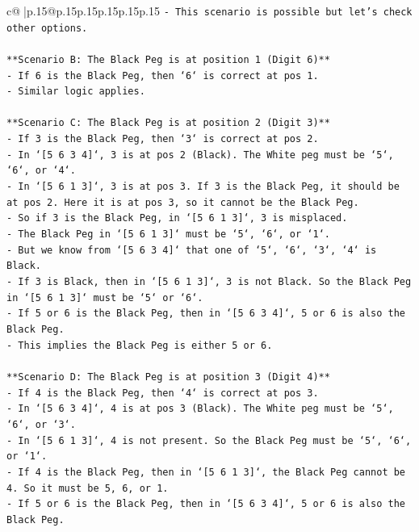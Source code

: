 \documentclass{article}
\begin{document}
{\begin{supertabular}{c@{$\;$}|p{.15\linewidth}@{}p{.15\linewidth}p{.15\linewidth}p{.15\linewidth}p{.15\linewidth}p{.15\linewidth}}
{{{\texttt{{-} This scenario is possible but let's check other options.} \\
\\ 
\texttt{**Scenario B: The Black Peg is at position 1 (Digit 6)**} \\
\texttt{{-} If 6 is the Black Peg, then `6` is correct at pos 1.} \\
\texttt{{-} Similar logic applies.} \\
\\ 
\texttt{**Scenario C: The Black Peg is at position 2 (Digit 3)**} \\
\texttt{{-} If 3 is the Black Peg, then `3` is correct at pos 2.} \\
\texttt{{-} In `{[}5 6 3 4{]}`, 3 is at pos 2 (Black). The White peg must be `5`, `6`, or `4`.} \\
\texttt{{-} In `{[}5 6 1 3{]}`, 3 is at pos 3. If 3 is the Black Peg, it should be at pos 2. Here it is at pos 3, so it cannot be the Black Peg.} \\
\texttt{{-} So if 3 is the Black Peg, in `{[}5 6 1 3{]}`, 3 is misplaced.} \\
\texttt{{-} The Black Peg in `{[}5 6 1 3{]}` must be `5`, `6`, or `1`.} \\
\texttt{{-} But we know from `{[}5 6 3 4{]}` that one of `5`, `6`, `3`, `4` is Black.} \\
\texttt{{-} If 3 is Black, then in `{[}5 6 1 3{]}`, 3 is not Black. So the Black Peg in `{[}5 6 1 3{]}` must be `5` or `6`.} \\
\texttt{{-} If 5 or 6 is the Black Peg, then in `{[}5 6 3 4{]}`, 5 or 6 is also the Black Peg.} \\
\texttt{{-} This implies the Black Peg is either 5 or 6.} \\
\\ 
\texttt{**Scenario D: The Black Peg is at position 3 (Digit 4)**} \\
\texttt{{-} If 4 is the Black Peg, then `4` is correct at pos 3.} \\
\texttt{{-} In `{[}5 6 3 4{]}`, 4 is at pos 3 (Black). The White peg must be `5`, `6`, or `3`.} \\
\texttt{{-} In `{[}5 6 1 3{]}`, 4 is not present. So the Black Peg must be `5`, `6`, or `1`.} \\
\texttt{{-} If 4 is the Black Peg, then in `{[}5 6 1 3{]}`, the Black Peg cannot be 4. So it must be 5, 6, or 1.} \\
\texttt{{-} If 5 or 6 is the Black Peg, then in `{[}5 6 3 4{]}`, 5 or 6 is also the Black Peg.} \\
}}}
\end{supertabular}}
\end{document}
